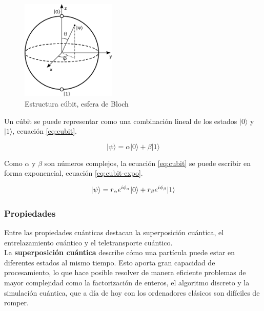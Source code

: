 \begin{figure}[h]
	\centering
	\includegraphics[width=0.4\textwidth]{figuras/esfera_bloch.png}
	\caption{Estructura cúbit, esfera de Bloch \cite{esfera-bloch}}
	\label{fig:esfera-bloch}
\end{figure}

Un cúbit se puede representar como una combinación lineal de los estados $|0\rangle$ y $|1\rangle$, ecuación \ref{eq:cubit}.

\begin{equation}\label{eq:cubit}
|\psi \rangle = \alpha|0\rangle + \beta |1\rangle
\end{equation}

Como $\alpha$ y $\beta$ son números complejos, la ecuación \ref{eq:cubit} se puede escribir en forma exponencial, ecuación \ref{eq:cubit-expo}.

\begin{equation}\label{eq:cubit-expo}
|\psi\rangle = r_{\alpha} e^{i\phi_{\alpha}}|0\rangle + r_{\beta} e^{i\phi_{\beta}}|1\rangle\\
\end{equation}

\vspace{1em}
\subsubsection{Propiedades}
Entre las propiedades cuánticas destacan la superposición cuántica, el entrelazamiento cuántico y el teletransporte cuántico.\\

La \textbf{superposición cuántica} describe cómo una partícula puede estar en diferentes estados al mismo tiempo. Esto aporta gran capacidad de procesamiento, lo que hace posible resolver de manera eficiente problemas de mayor complejidad como la factorización de enteros, el algoritmo discreto y la simulación cuántica, que a día de hoy con los ordenadores clásicos son difíciles de romper. 


